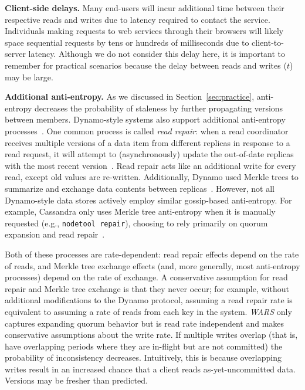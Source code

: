 \documentclass{vldb}
\begin{document}
\textbf{Client-side delays.} Many end-users will incur additional time
between their respective reads and writes due to latency required to
contact the service.  Individuals making requests to web services
through their browsers will likely space sequential requests by tens
or hundreds of milliseconds due to client-to-server latency.  Although
we do not consider this delay here, it is important to remember for
practical scenarios because the delay between reads and writes ($t$)
may be large.

\textbf{Additional anti-entropy.} As we discussed in
Section~\ref{sec:practice}, anti-entropy decreases the probability of
staleness by further propagating versions between members.
Dynamo-style systems also support additional anti-entropy
processes~\cite{nosql}.  One common process is called \textit{read
  repair}: when a read coordinator receives multiple versions of a
data item from different replicas in response to a read request, it
will attempt to (asynchronously) update the out-of-date replicas with
the most recent version~\cite[Section 5]{dynamo}.  Read repair acts
like an additional write for every read, except old values are
re-written.  Additionally, Dynamo used Merkle trees to summarize and
exchange data contents between replicas~\cite[Section 4.7]{dynamo}.
However, not all Dynamo-style data stores actively employ similar
gossip-based anti-entropy.  For example, Cassandra only uses Merkle
tree anti-entropy when it is manually requested (e.g.,
\texttt{nodetool repair}), choosing to rely primarily on quorum
expansion and read repair~\cite{cassandra-merkle}.

Both of these processes are rate-dependent: read repair effects depend
on the rate of reads, and Merkle tree exchange effects (and, more
generally, most anti-entropy processes) depend on the rate of
exchange.  A conservative assumption for read repair and Merkle tree
exchange is that they never occur; for example, without additional
modifications to the Dynamo protocol, assuming a read repair rate is
equivalent to assuming a rate of reads from each key in the system.
\textit{WARS} only captures expanding quorum behavior but is read rate
independent and makes conservative assumptions about the write rate.
If multiple writes overlap (that is, have overlapping periods where
they are in-flight but are not committed) the probability of
inconsistency decreases.  Intuitively, this is because overlapping
writes result in an increased chance that a client reads
as-yet-uncommitted data.  Versions may be fresher than
predicted.
\end{document}
